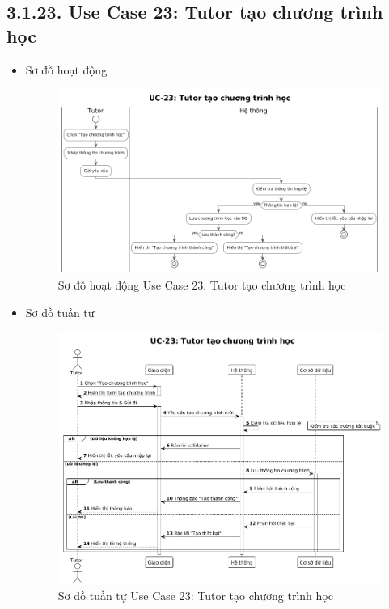 \subsection*{3.1.23. Use Case 23: Tutor tạo chương trình học}
\begin{itemize}
    \item Sơ đồ hoạt động
    \begin{figure}[H]
    \centering
    \includegraphics[scale=0.4 ]{Picture/ACUC23.png}
    \caption{Sơ đồ hoạt động Use Case 23: Tutor tạo chương trình học}
    \end{figure}
    \item Sơ đồ tuần tự
    \begin{figure}[H]
    \centering
    \includegraphics[scale=0.4 ]{Picture/SEUC23.png}
    \caption{Sơ đồ tuần tự Use Case 23: Tutor tạo chương trình học}
    \end{figure}
\end{itemize}
